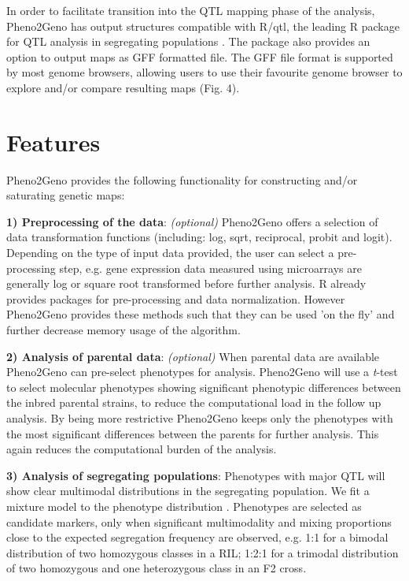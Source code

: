 In order to facilitate transition into the QTL mapping phase of the analysis, Pheno2Geno has 
output structures compatible with R/qtl, the leading R package for QTL analysis in segregating 
populations \cite{Broman:2003, Arends:2010}. The package also provides an option to output maps as 
GFF formatted file. The GFF file format is supported by most genome browsers, allowing users to 
use their favourite genome browser to explore and/or compare resulting maps (Fig. 4).

\section{Features}
Pheno2Geno provides the following functionality for constructing and/or saturating genetic maps:

{\bf 1) Preprocessing of the data}: \emph{(optional)} 
Pheno2Geno offers a selection of data transformation functions (including: log, sqrt, reciprocal, 
probit and logit). Depending on the type of input data provided, the user can select a 
pre-processing step, e.g. gene expression data measured using microarrays are generally log 
\cite{Quackenbush:2002} or square root \cite{Jansen:2001b, Gort:2010} transformed before further 
analysis. R already provides packages for pre-processing and data normalization. However 
Pheno2Geno provides these methods such that they can be used 'on the fly' and further decrease 
memory usage of the algorithm.

{\bf 2) Analysis of parental data}: \emph{(optional)} 
When parental data are available Pheno2Geno can pre-select phenotypes for analysis. Pheno2Geno 
will use a \emph{t}-test to select molecular phenotypes showing significant phenotypic differences 
between the inbred parental strains, to reduce the computational load in the follow up analysis. 
By being more restrictive Pheno2Geno keeps only the phenotypes with the most significant differences 
between the parents for further analysis. This again reduces the computational burden of the 
analysis.

{\bf 3) Analysis of segregating populations}:
Phenotypes with major QTL will show clear multimodal distributions in the segregating population. 
We fit a mixture model to the phenotype distribution \cite{Jansen:1993, Jansen:2001b, Benaglia:2009}. 
Phenotypes are selected as candidate markers, only when significant multimodality and mixing 
proportions close to the expected segregation frequency are observed, e.g. 1:1 for a bimodal 
distribution of two homozygous classes in a RIL; 1:2:1 for a trimodal distribution of two homozygous 
and one heterozygous class in an F2 cross.

